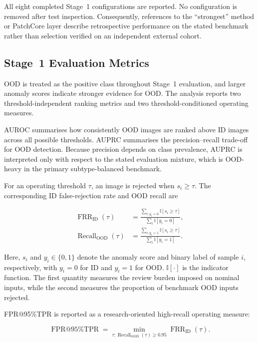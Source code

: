 \documentclass[fleqn,12pt]{olplainarticle}
\begin{document}
All eight completed Stage~1 configurations are reported. No configuration is
removed after test inspection. Consequently, references to the ``strongest''
method or PatchCore layer describe retrospective performance on the stated
benchmark rather than selection verified on an independent external cohort.

\subsection{Stage~1 Evaluation Metrics}
\label{subsec:stage1_metrics}

OOD is treated as the positive class throughout Stage~1 evaluation, and larger
anomaly scores indicate stronger evidence for OOD. The analysis reports two
threshold-independent ranking metrics and two threshold-conditioned operating
measures.

AUROC summarises how consistently OOD images are ranked above ID images across
all possible thresholds. AUPRC summarises the precision--recall trade-off for
OOD detection. Because precision depends on class prevalence, AUPRC is
interpreted only with respect to the stated evaluation mixture, which is
OOD-heavy in the primary subtype-balanced benchmark.

For an operating threshold $\tau$, an image is rejected when $s_i\geq\tau$.
The corresponding ID false-rejection rate and OOD recall are

\begin{align}
    \operatorname{FRR}_{\mathrm{ID}}(\tau)
    &=
    \frac{
        \sum_{i:y_i=0}
        \mathbb{I}[s_i\geq\tau]
    }{
        \sum_i \mathbb{I}[y_i=0]
    },
    \label{eq:protocol_id_frr}\\[3pt]
    \operatorname{Recall}_{\mathrm{OOD}}(\tau)
    &=
    \frac{
        \sum_{i:y_i=1}
        \mathbb{I}[s_i\geq\tau]
    }{
        \sum_i \mathbb{I}[y_i=1]
    }.
    \label{eq:protocol_ood_recall}
\end{align}

Here, $s_i$ and $y_i\in\{0,1\}$ denote the anomaly score and binary label of
sample $i$, respectively, with $y_i=0$ for ID and $y_i=1$ for OOD.
$\mathbb{I}[\cdot]$ is the indicator function. The first quantity measures the
review burden imposed on nominal inputs, while the second measures the
proportion of benchmark OOD inputs rejected.

FPR@95\%TPR is reported as a research-oriented high-recall operating measure:

\begin{equation}
    \operatorname{FPR@95\%TPR}
    =
    \min_{\tau:
    \operatorname{Recall}_{\mathrm{OOD}}(\tau)\geq0.95}
    \operatorname{FRR}_{\mathrm{ID}}(\tau).
    \label{eq:protocol_fpr95}
\end{equation}
\end{document}
